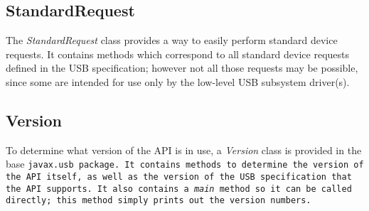 \documentclass{article}
\newcommand{\myclass}[1]{\emph{#1}}
\newcommand{\mypackage}[1]{\tt#1\rm}
\newcommand{\mymethod}[1]{\emph{#1}}
\newcommand{\mysectionend}[0]{\vfill\pagebreak[1]}
\begin{document}
\subsection{StandardRequest}

The \myclass{StandardRequest} class provides a way to easily perform standard device requests.
It contains methods which correspond to all standard device requests defined in the USB
specification; however not all those requests may be possible, since some are intended for
use only by the low-level USB subsystem driver(s).

\subsection{Version}

To determine what version of the API is in use, a \myclass{Version} class is
provided in the base \mypackage{javax.usb} package.  It contains methods to determine
the version of the API itself, as well as the version of the USB specification
that the API supports.  It also contains a \mymethod{main} method so it can
be called directly; this method simply prints out the version numbers.

\mysectionend
\end{document}
